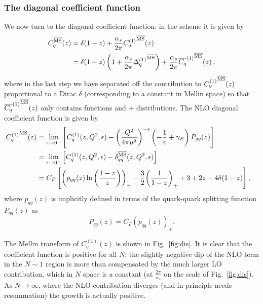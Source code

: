 \subsubsection{The diagonal coefficient function}
\label{sec:diag}
We now turn to the diagonal coefficient function: in the \msbar{} scheme
it is given by
\begin{align}\label{eq:pos/cq}
  C_q^{{\overline{\textrm{MS}}}}(z)&=\delta(1-z)+ \frac{\alpha_s}{2\pi}
  {C^{(1)}_q}^{{\overline{\textrm{MS}}}}(z)\\
    &=\delta(1-z) \left(1+\frac{\alpha_s}{2\pi} {\Delta^{(1)}_q}^{{\overline{\textrm{MS}}}}\right)
  +\frac{\alpha_s}{2\pi}  {\overline{C_{q}}^{(1)}}^{{\overline{\textrm{MS}}}}(z) \,,\label{eq:pos/cqnodist}
\end{align}
where in the last step we have separated off the contribution to
$ {C^{(1)}_q}^{{\overline{\textrm{MS}}}}(z)$ proportional to a Dirac $\delta$
(corresponding to a constant in Mellin space) so that
${\overline{C_{q}}^{(1)}}^{{\overline{\textrm{MS}}}}(z)$ only contains  functions and
$+$ distributions.
The NLO diagonal coefficient function is given by
\begin{align}
\hspace*{-1em}{C^{(1)}_q}^{{\overline{\textrm{MS}}}}(z)&=
\lim_{\epsilon\to
  0^-}\left[C_{q}^{(1)}(z,Q^2,\epsilon) - \left(\frac{Q^2}{4\pi
      \mu^2}\right)^{-\epsilon} \left(-\frac 1
    {\epsilon}+\gamma_E\right) P_{qq}(z)\right]\label{eq:pos/cqren}\\
&=\lim_{\epsilon\to0^-}\left[ {C_q^{(1)}}(z,Q^2,\epsilon)
    -\delta_{qq}^{{\overline{\textrm{MS}}}}(z,Q^2,\epsilon)\right]\label{eq:pos/renormq}\\
&= C_F\left[ \left(p_{qq}(z)
    \ln\left(\frac{1-z}{z}\right) \right)_+ - \frac {3}{2}{ \left( \frac{1}{1-z} \right)_+ } + 3
    + 2 z - 4 \delta(1-z)\right]\label{eq:pos/cqnlo},
\end{align}
where 
$p_{qq}(z)$ is implicitly defined in terms of the quark-quark
splitting function $P_{qq}(z)$ as
\begin{equation}\label{eq:pos/pqq}
  P_{qq}(z)= C_F\left(p_{qq}(z)\right)_+.
\end{equation}


The Mellin transform of $C^{(1)}_q(z)$ is shown in
Fig.~\ref{fig:dis}. It is clear that the coefficient function is
positive for all $N$: the slightly negative dip of the NLO term
in the $N\sim 1$
region is more than compensated by the much larger LO contribution,
which in $N$ space is a constant (at $\frac{2 \pi}{\alpha_s}$ on the
scale of Fig.~\ref{fig:dis}). 
As $N\to\infty$, where the NLO contribution diverges (and in
principle needs resummation) the growth is actually positive.

